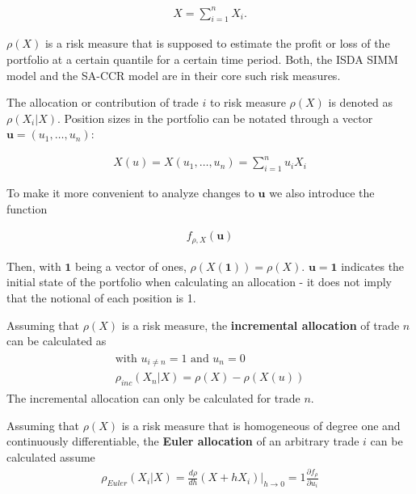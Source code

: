 \documentclass[../Thesis_AHoecherl.tex]{subfiles}
\begin{document}
\begin{align}
    X = \sum_{i=1}^n{X_i} \text{.}
\end{align}

$\rho(X)$ is a risk measure that is supposed to estimate the profit or loss of the portfolio at a certain quantile for a certain time period. 
Both, the \gls{ISDA SIMM} model and the \gls{SA-CCR} model are in their core such risk measures.

The allocation or contribution of trade $i$ to risk measure $\rho(X)$ is denoted as $\rho\left(X_i|X\right)$. Position sizes in the portfolio can be notated through a vector $\mathbf{u} = (u_1,\dots, u_n)$:

\begin{align}
    X(u) = X(u_1, \dots, u_n) = \sum_{i=1}^{n}{u_iX_i}
\end{align}

To make it more convenient to analyze changes to $\mathbf{u}$ we also introduce the function

\begin{align}
    f_{\rho,X}\left(\mathbf{u}\right)
\end{align}

Then, with $\mathbf{1}$ being a vector of ones, $\rho\left(X\left(\mathbf{1}\right)\right) = \rho\left(X\right)$. $\mathbf{u} = \mathbf{1}$ indicates the initial state of the portfolio when calculating an allocation - it does not imply that the notional of each position is 1.

\begin{definition}
    Assuming that $\rho\left(X\right)$ is a risk measure, the \textbf{incremental allocation} of trade $n$ can be calculated as
    \begin{gather}
        \begin{split}
            \text{with } u_{i\neq n} = 1 \text{ and }u_n = 0\\
            \rho_{inc}\left(X_n|X\right) = \rho\left(X\right) - \rho\left(X\left(u\right)\right)    
        \end{split}
    \end{gather}
    The incremental allocation can only be calculated for trade $n$.
\end{definition}

\begin{definition}[\label{def:Euler allocation}]
    Assuming that $\rho\left(X\right)$ is a risk measure that is homogeneous of degree one and continuously differentiable, the \textbf{Euler allocation} of an arbitrary trade $i$ can be calculated assume
    \begin{gather}
        \label{eq:Euler allocation}
        \rho_{Euler}\left(X_i|X\right) = \frac{d\rho}{dh}\left(X+hX_i\right)|_{h\rightarrow0} = 1\frac{\partial f_{\rho}}{\partial u_i}
    \end{gather}
\end{definition}
\end{document}
